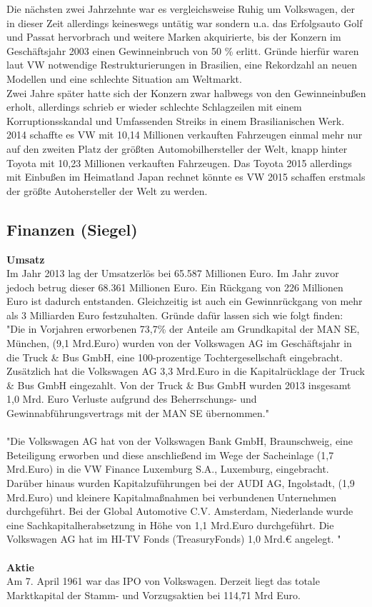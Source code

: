 \documentclass[12pt]{article}
\begin{document}
Die nächsten zwei Jahrzehnte war es vergleichsweise Ruhig um  Volkswagen, der in dieser Zeit allerdings keineswegs untätig war sondern u.a. das Erfolgsauto Golf und Passat hervorbrach und weitere Marken akquirierte, bis der Konzern im Geschäftsjahr 2003 einen Gewinneinbruch von 50 \% erlitt. Gründe hierfür waren laut VW notwendige Restrukturierungen in Brasilien, eine Rekordzahl an neuen Modellen und eine schlechte Situation am Weltmarkt. \cite{sud} \\
Zwei Jahre später hatte sich der Konzern zwar halbwegs von den Gewinneinbußen erholt, allerdings schrieb er wieder schlechte Schlagzeilen mit einem Korruptionsskandal und Umfassenden Streiks in einem Brasilianischen Werk. \cite{autowp}\\
2014 schaffte es VW mit 10,14 Millionen verkauften Fahrzeugen einmal mehr nur auf den zweiten Platz der größten Automobilhersteller der Welt, knapp hinter Toyota mit 10,23 Millionen verkauften Fahrzeugen. Das Toyota 2015 allerdings mit Einbußen im Heimatland Japan rechnet könnte es VW 2015 schaffen erstmals der größte Autohersteller der Welt zu werden.

\subsection{Finanzen (Siegel)}
\textbf{Umsatz}\\
Im Jahr 2013 lag der Umsatzerlös bei 65.587 Millionen Euro. Im Jahr zuvor jedoch betrug dieser 68.361 Millionen Euro. Ein Rückgang von 226 Millionen Euro ist dadurch entstanden. Gleichzeitig ist auch ein Gewinnrückgang von mehr als 3 Milliarden Euro festzuhalten. Gründe dafür lassen sich wie folgt finden:
\\
"Die in Vorjahren erworbenen 73,7\% der Anteile am Grundkapital der MAN SE, München, (9,1 Mrd.Euro) wurden von
der Volkswagen AG im Geschäftsjahr in die Truck \& Bus GmbH, eine 100-prozentige Tochtergesellschaft eingebracht.
Zusätzlich hat die Volkswagen AG 3,3 Mrd.Euro in die Kapitalrücklage der Truck \& Bus GmbH eingezahlt. Von der Truck \&
Bus GmbH wurden 2013 insgesamt 1,0 Mrd. Euro Verluste aufgrund des Beherrschungs- und Gewinnabführungsvertrags
mit der MAN SE übernommen." \cite[Seite 3]{jbilanz2013vw}
\\\\
"Die Volkswagen AG hat von der Volkswagen Bank GmbH, Braunschweig, eine Beteiligung erworben und diese anschließend im Wege der Sacheinlage (1,7 Mrd.Euro) in die VW Finance Luxemburg S.A., Luxemburg, eingebracht.\\
Darüber hinaus wurden Kapitalzuführungen bei der AUDI AG, Ingolstadt, (1,9 Mrd.Euro) und kleinere Kapitalmaßnahmen bei verbundenen Unternehmen durchgeführt. Bei der Global Automotive C.V. Amsterdam, Niederlande
wurde eine Sachkapitalherabsetzung in Höhe von 1,1 Mrd.Euro durchgeführt. Die Volkswagen AG hat im HI-TV Fonds (TreasuryFonds) 1,0 Mrd.€ angelegt. "\cite[Seite 4]{jbilanz2013vw}
\\ \\ 
\textbf{Aktie} \\
Am 7. April 1961 war das IPO von Volkswagen. Derzeit liegt das totale Marktkapital der Stamm- und Vorzugsaktien bei 114,71 Mrd Euro. %
\end{document}
